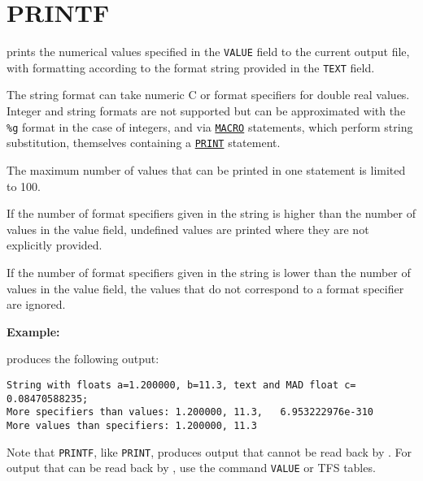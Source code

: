 \section{PRINTF}
\label{sec:printf}
prints the numerical values specified in the \texttt{VALUE} field to the
current output file, with formatting according to the format string
provided in the \texttt{TEXT} field. 

The string format can take numeric C or \madx format specifiers for
double real values. Integer and string formats are not supported but 
can be approximated with the \texttt{\%g} format in the case of
integers, and via \hyperref[sec:macro]{\texttt{MACRO}} statements, which
perform string substitution, themselves containing a
\hyperref[sec:print]{\texttt{PRINT}} statement.   

The maximum number of values that can be printed in one
statement is limited to 100. 

If the number of format specifiers given in the string is higher 
than the number of values in the value field, undefined values are
printed where they are not explicitly provided. 

If the number of format specifiers given in the string is lower 
than the number of values in the value field, the values that 
do not correspond to a format specifier are ignored. 


\textbf{Example:}
{\small
{}}

produces the following output:
\begin{verbatim}
String with floats a=1.200000, b=11.3, text and MAD float c=  0.08470588235;
More specifiers than values: 1.200000, 11.3,   6.953222976e-310
More values than specifiers: 1.200000, 11.3
\end{verbatim}

Note that \texttt{PRINTF}, like \texttt{PRINT}, produces output that
cannot be read back by \madx. For output that can be read back by \madx,
use the command \texttt{VALUE} or TFS tables.

